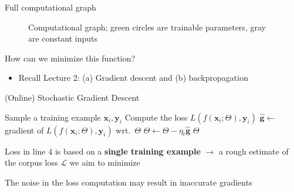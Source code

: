 \documentclass[12pt,aspectratio=169,handout]{beamer}
\begin{document}
\begin{frame}{Full computational graph}
\begin{figure}
	\caption{Computational graph; green circles are trainable parameters, gray are constant inputs}
\end{figure}

How can we minimize this function?

\begin{itemize}
	\item Recall Lecture 2: (a) Gradient descent and (b) backpropagation
\end{itemize}

\end{frame}

\begin{frame}{(Online) Stochastic Gradient Descent}

\begin{algorithmic}[1]
		\State Sample a training example $\bm{x}_i, \bm{y}_i$
		\State Compute the loss $L(f(\bm{x}_i; \Theta), \bm{y}_i)$
		\State $\hat{\bm{g}} \gets$ gradient of $L(f(\bm{x}_i; \Theta), \bm{y}_i)$ wrt.\ $\Theta$
		\State $\Theta \gets \Theta - \eta_t \hat{\bm{g}}$
	\EndWhile
	\State \Return $\Theta$
	\EndFunction
\end{algorithmic}

Loss in line 4 is based on a \textbf{single training example} $\to$ a rough estimate of the corpus loss $\mathcal{L}$ we aim to minimize

The noise in the loss computation may result in inaccurate gradients

\end{frame}
\end{document}
